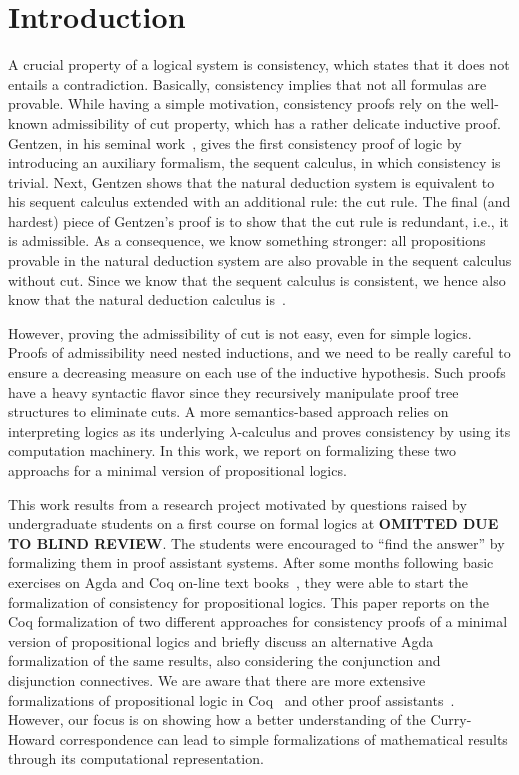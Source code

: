 \begin{coqdoccode}
\coqdocemptyline
\coqdocemptyline
\end{coqdoccode}
\section{Introduction}


A crucial property of a logical system is consistency, which states that it does not
entails a contradiction. Basically, consistency implies that not all formulas
are provable.  While having a simple motivation, consistency proofs rely on
the well-known admissibility of cut property, which has a rather delicate inductive proof.
Gentzen, in his seminal work~\cite{Gentzen36}, gives the first consistency proof of logic by introducing an
auxiliary formalism, the sequent calculus, in which consistency is trivial. Next, Gentzen shows
that the natural deduction system is equivalent to his sequent calculus extended with an
additional rule: the cut rule. The final (and hardest) piece of Gentzen's proof is to 
show that the cut rule is redundant, i.e., it is admissible. As a consequence, we know
something stronger: all propositions provable in the natural deduction system are also provable
in the sequent calculus without cut. Since we know that the sequent calculus is consistent,
we hence also know that the natural deduction calculus is~\cite{Negri2001}.


However, proving the admissibility of cut is not easy, even for simple logics.
Proofs of admissibility need nested inductions, and we need to be really careful to
ensure a decreasing measure on each use of the inductive hypothesis. Such proofs have
a heavy syntactic flavor since they recursively manipulate proof tree structures to
eliminate cuts. A more semantics-based approach relies on interpreting logics as its
underlying $\lambda$-calculus and proves consistency by using its computation machinery.
In this work, we report on formalizing these two approachs for a minimal version of
propositional logics.


This work results from a research project motivated by questions raised by
undergraduate students on a first course on formal logics at \textbf{OMITTED DUE TO BLIND REVIEW}.
The students were encouraged to ``find the answer'' by formalizing them in proof assistant systems.
After some months following basic exercises on Agda and Coq on-line text books~\cite{plfa2019,Pierce18},
they were able to start the formalization of consistency for propositional logics. This paper reports on
the Coq formalization of two different approaches for consistency proofs of a minimal version of
propositional logics and briefly discuss an alternative Agda formalization of the same results, also considering
the conjunction and disjunction connectives. We are aware that there are more extensive formalizations of propositional logic 
 in Coq~\cite{doorn2015} and other proof assistants~\cite{Nipkow17}. However, our focus is
on showing how a better understanding of the Curry-Howard correspondence can lead to simple formalizations
of mathematical results through its computational representation.



